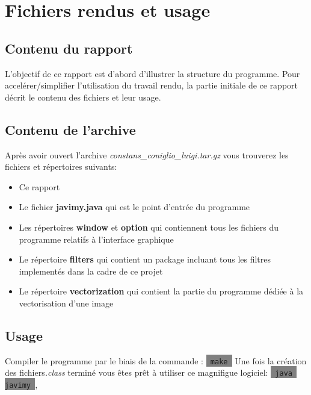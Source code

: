 \documentclass[twoside,openright,a4paper,11pt,french]{article}
\begin{document}
\pagestyle{plain}
\setlength{\parindent}{0pt}



\parskip=0pt
\tableofcontents


\vspace{5cm}


\section{Fichiers rendus et usage}
\subsection{Contenu du rapport}
L'objectif de ce rapport est d'abord d'illustrer la structure du
programme. Pour accelérer/simplifier l'utilisation du travail rendu, la partie
initiale de ce rapport décrit le contenu des fichiers et leur usage.

\subsection{Contenu de l'archive}
Après avoir ouvert l'archive {\it constans\_coniglio\_luigi.tar.gz} vous
trouverez les fichiers et répertoires suivants:
\smallbreak
\begin{itemize}
\item Ce rapport
\item Le fichier {\bf javimy.java} qui est le point d'entrée du programme
\item Les répertoires {\bf window} et {\bf option} qui contiennent tous les fichiers du programme relatifs
      à l'interface graphique
\item Le répertoire {\bf filters} qui contient un package incluant tous les filtres 
      implementés dans la cadre de ce projet
\item Le répertoire {\bf vectorization} qui contient la partie du programme dédiée à
      la vectorisation d'une image
\end{itemize}

\subsection{Usage}
Compiler le programme par le biais de la commande : 
\colorbox{gray}{\lstinline[basicstyle=\ttfamily\color{black}]| make |}
Une fois la création des fichiers{\it .class} terminé vous êtes prêt
à utiliser ce magnifigue logiciel: 
\colorbox{gray}{\lstinline[basicstyle=\ttfamily\color{black}]| java javimy |},
\end{document}
